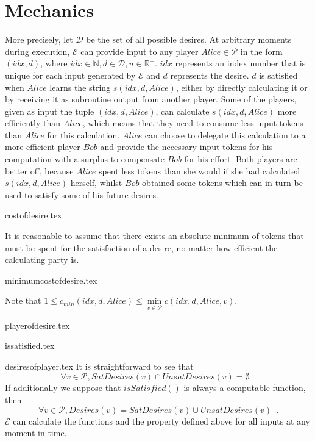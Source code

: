 \section{Mechanics}
  More precisely, let $\mathcal{D}$ be the set of all possible desires. At arbitrary moments during execution, $\mathcal{E}$
  can provide input to any player $Alice \in \mathcal{P}$ in the form $\left(idx, d\right)$, where $idx \in \mathbb{N}, d \in
  \mathcal{D}, u \in \mathbb{R}^{+}$. $idx$ represents an index number that is unique for each input generated by $\mathcal{E}$
  and $d$ represents the desire. $d$ is satisfied when $Alice$ learns the string $s\left(idx, d, Alice\right)$, either by
  directly calculating it or by receiving it as subroutine output from another player. Some of the players, given as input the
  tuple $\left(idx, d, Alice\right)$, can calculate $s\left(idx, d, Alice\right)$ more efficiently than $Alice$, which means
  that they need to consume less input tokens than $Alice$ for this calculation. $Alice$ can choose to delegate this
  calculation to a more efficient player $Bob$ and provide the necessary input tokens for his computation with a surplus to
  compensate $Bob$ for his effort. Both players are better off, because $Alice$ spent less tokens than she would if she had
  calculated $s\left(idx, d, Alice\right)$ herself, whilst $Bob$ obtained some tokens which can in turn be used to satisfy some
  of his future desires.
 
  {costofdesire.tex}

  It is reasonable to assume that there exists an absolute minimum of tokens that must be spent for the satisfaction of a
  desire, no matter how efficient the calculating party is.

  {minimumcostofdesire.tex}

  \noindent Note that $1 \leq c_{min}\left(idx, d, Alice\right) \leq \min\limits_{v \in \mathcal{P}}{c\left(idx, d, Alice,
  v\right)}$.

  {playerofdesire.tex}

  {issatisfied.tex}

  {desiresofplayer.tex}
  It is straightforward to see that
  \begin{equation*}
    \forall v \in \mathcal{P}, SatDesires\left(v\right) \cap UnsatDesires\left(v\right) = \emptyset \enspace.
  \end{equation*}
  If additionally we suppose that $isSatisfied\left(\right)$ is always a computable function, then
  \begin{equation*}
    \forall v \in \mathcal{P}, Desires\left(v\right) = SatDesires\left(v\right) \cup UnsatDesires\left(v\right) \enspace.
  \end{equation*}
  $\mathcal{E}$ can calculate the functions and the property defined above for all inputs at any moment in time.

